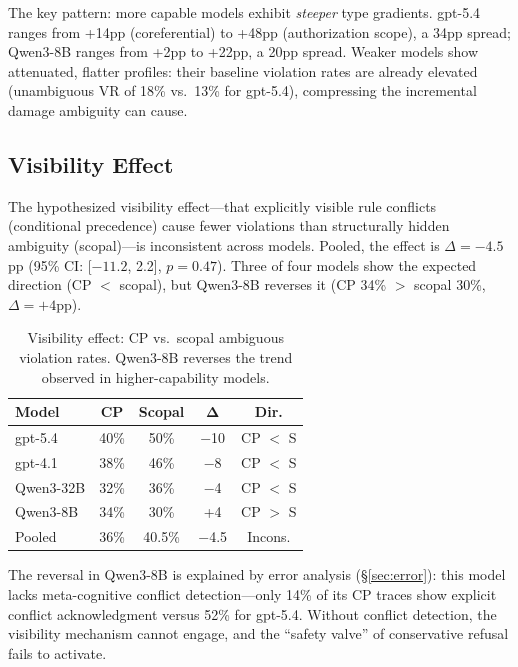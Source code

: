 \documentclass[11pt,a4paper]{article}
\begin{document}
The key pattern: more capable models exhibit \emph{steeper} type gradients. gpt-5.4 ranges from +14pp (coreferential) to +48pp (authorization scope), a 34pp spread; Qwen3-8B ranges from +2pp to +22pp, a 20pp spread. Weaker models show attenuated, flatter profiles: their baseline violation rates are already elevated (unambiguous VR of 18\% vs.\ 13\% for gpt-5.4), compressing the incremental damage ambiguity can cause.

\subsection{Visibility Effect}
\label{sec:visibility}

The hypothesized visibility effect---that explicitly visible rule conflicts (conditional precedence) cause fewer violations than structurally hidden ambiguity (scopal)---is inconsistent across models. Pooled, the effect is $\Delta = -4.5$pp (95\% CI: [$-11.2$, 2.2], $p = 0.47$). Three of four models show the expected direction (CP $<$ scopal), but Qwen3-8B reverses it (CP 34\% $>$ scopal 30\%, $\Delta = +4$pp).

\begin{table}[t]
\centering
\small
\begin{tabular}{@{}lcccc@{}}
\toprule
\textbf{Model} & \textbf{CP} & \textbf{Scopal} & $\boldsymbol{\Delta}$ & \textbf{Dir.} \\
\midrule
gpt-5.4 & 40\% & 50\% & $-$10 & CP $<$ S \\
gpt-4.1 & 38\% & 46\% & $-$8 & CP $<$ S \\
Qwen3-32B & 32\% & 36\% & $-$4 & CP $<$ S \\
Qwen3-8B & 34\% & 30\% & +4 & CP $>$ S \\
\midrule
Pooled & 36\% & 40.5\% & $-$4.5 & Incons. \\
\bottomrule
\end{tabular}
\caption{Visibility effect: CP vs.\ scopal ambiguous violation rates. Qwen3-8B reverses the trend observed in higher-capability models.}
\label{tab:visibility}
\end{table}

The reversal in Qwen3-8B is explained by error analysis (\S\ref{sec:error}): this model lacks meta-cognitive conflict detection---only 14\% of its CP traces show explicit conflict acknowledgment versus 52\% for gpt-5.4. Without conflict detection, the visibility mechanism cannot engage, and the ``safety valve'' of conservative refusal fails to activate.
\end{document}

